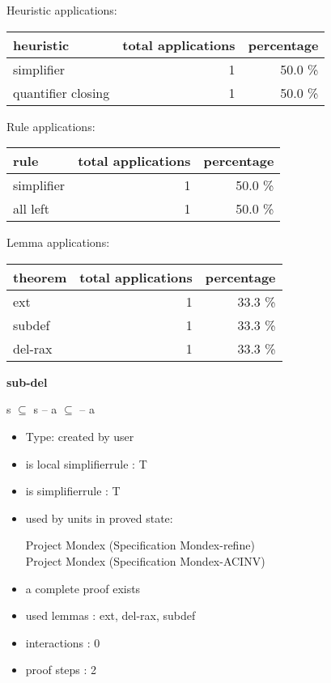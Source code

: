 \documentclass[a4paper]{article}
\begin{document}
\medskip


Heuristic applications:

\begin{supertabular}{l|r|r}
heuristic	& total applications & percentage \\ \hline
simplifier & 1 & 50.0 \% \\
quantifier closing & 1 & 50.0 \% \\

\end{supertabular}

Rule applications:

\begin{supertabular}{l|r|r}
rule	        & total applications & percentage \\ \hline
simplifier & 1 & 50.0 \% \\
all left & 1 & 50.0 \% \\

\end{supertabular}

Lemma applications:

\begin{supertabular}{l|r|r}
theorem	        & total applications & percentage \\ \hline
ext & 1 & 33.3 \% \\
subdef & 1 & 33.3 \% \\
del-rax & 1 & 33.3 \% \\

\end{supertabular}
\pagebreak

{\LARGE\bf sub-del}\label{lemma-sub-del}

\medskip

 \Fol s $\subseteq$  \Imp s -- a $\subseteq$  -- a

\begin{itemize}

\item Type: created by user

\item is local simplifierrule : T
\item is simplifierrule : T
\item used by units in proved state:

Project Mondex (Specification Mondex-refine) \\
Project Mondex (Specification Mondex-ACINV)
\item       a complete proof exists
\item       used lemmas  : ext, del-rax, subdef
\item       interactions : 0
\item       proof steps  : 2
\end{itemize}
\end{document}
